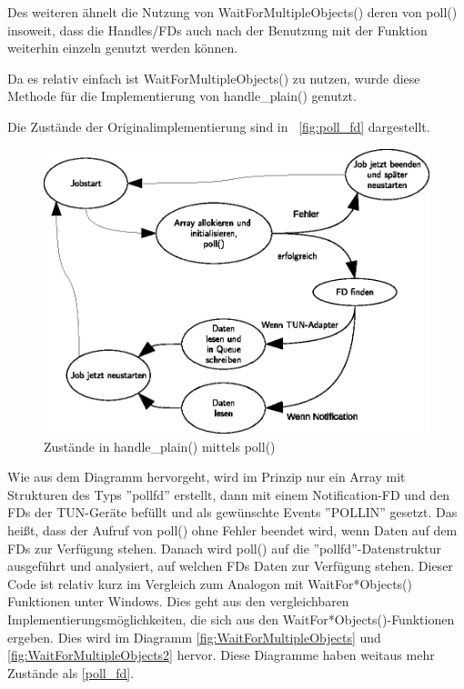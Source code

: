 Des weiteren ähnelt die Nutzung von WaitForMultipleObjects() deren von poll()
insoweit, dass die Handles/\acp{FD} auch nach der Benutzung mit der Funktion
weiterhin einzeln genutzt werden können.

Da es relativ einfach ist WaitForMultipleObjects() zu nutzen, wurde diese Methode
für die Implementierung von handle\_plain() genutzt.

Die Zustände der Originalimplementierung sind in ~\autoref{fig:poll_fd}
dargestellt.

\begin{figure}
\caption{Zustände in handle\_plain() mittels poll()}
\label{fig:poll_fd}
\centering
\def\svgwidth{\columnwidth}
\includegraphics[width=\textwidth]{poll_fd.eps}
\end{figure}


Wie aus dem Diagramm hervorgeht, wird im Prinzip nur ein Array mit Strukturen des Typs
''pollfd'' erstellt, dann mit einem Notification-\ac{FD} und den \acp{FD} der TUN-Geräte befüllt
und als gewünschte Events ''POLLIN'' gesetzt. Das heißt, dass der Aufruf von poll() ohne
Fehler beendet wird, wenn Daten auf dem \acp{FD} zur Verfügung stehen.
Danach wird poll() auf die ''pollfd''-Datenstruktur ausgeführt und analysiert,
auf welchen \acp{FD} Daten zur Verfügung stehen. Dieser Code ist relativ kurz im
Vergleich zum Analogon mit WaitFor*Objects() Funktionen unter Windows.
Dies geht aus den vergleichbaren Implementierungsmöglichkeiten, die sich aus den
WaitFor*Objects()-Funktionen ergeben. Dies wird im Diagramm \autoref{fig:WaitForMultipleObjects}
und \autoref{fig:WaitForMultipleObjects2} hervor. Diese Diagramme haben weitaus
mehr Zustände als \autoref{poll_fd}.

